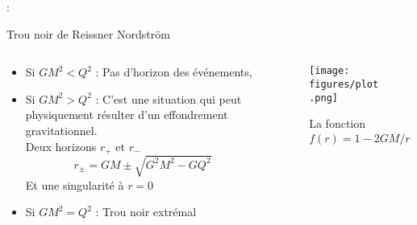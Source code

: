 \begin{frame}{\underline{\secname} : {\small \subsecname}}
\begin{block}{Trou noir de Reissner Nordström}

  \begin{columns}
	\begin{column}{0.5\linewidth}

\begin{itemize}
	\item 
	Si $G M^{2}<Q^{2}$ : Pas d'horizon des événements, 
	\item 
	Si $G M^{2}>Q^{2}$ : C'est une situation qui peut physiquement résulter d'un effondrement gravitationnel.\\
	Deux horizons $r_{+}$ et $r_{-}$
	\begin{equation*}
	r_{\pm}=G M \pm \sqrt{G^{2} M^{2}-G Q^{2} }
	\end{equation*}
	Et une singularité à $r = 0$
	\item 
	Si $G M^{2}=Q^{2}$ : Trou noir extrémal
\end{itemize}


\end{column}
\begin{column}{0.5\linewidth}
	

\begin{figure}[H]
	\begin{center}
		\texttt{[image: figures/plot.png]}
	\end{center}
	\caption{La fonction $ f(r)=1-{2 G M}/{r}+{G Q^{2} }/{r^{2}}$ }
	\label{r-n}
\end{figure}
	
\end{column}
\end{columns}


\end{block}
\end{frame}



